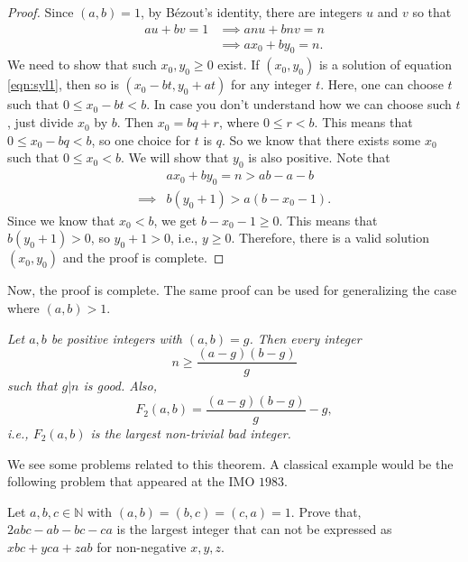 \documentclass{subfile}
\begin{document}
	\begin{proof}
		Since $(a,b)=1$, by B\'{e}zout's identity, there are integers $u$ and $v$ so that
			\begin{align}
				au+bv = 1 & \implies anu+bnv = n\nonumber\\
				& \implies ax_0+by_0  = n.\label{eqn:syl1}
			\end{align}
		We need to show that such $x_0,y_0 \geq 0$ exist. If $(x_0,y_0)$ is a solution of equation \eqref{eqn:syl1}, then so is $(x_0-bt,y_0+at)$ for any integer $t$. Here, one can choose $t$ such that $0 \leq x_0-bt<b$. In case you don't understand how we can choose such $t$, just divide $x_0$ by $b$. Then $x_0=bq+r$, where $0\leq r <b$. This means that $0 \leq x_0 -bq <b$, so one choice for $t$ is $q$. So we know that there exists some $x_0$ such that $0 \leq x_0<b$. We will show that $y_0$ is also positive. Note that
			\begin{align*}
				& ax_0+by_0 = n > ab-a-b\\
				\implies & b(y_0+1)  > a(b-x_0-1).
			\end{align*}
		Since we know that $x_0<b$, we get $b-x_0-1\geq 0$. This means that $b(y_0+1) >0$, so $y_0+1>0$, i.e., $y\geq0$. Therefore, there is a valid solution $(x_0,y_0)$ and the proof is complete.
	\end{proof}
Now, the proof is complete. The same proof can be used for generalizing the case where $(a,b)>1$.
	\begin{theorem}\slshape
		Let $a,b$ be positive integers with $(a,b)=g$. Then every integer \[n\geq\dfrac{(a-g)(b-g)}{g}\] such that $g|n$ is good. Also, \[F_2(a,b)=\dfrac{(a-g)(b-g)}{g}-g,\] i.e., $F_2(a,b)$ is the largest non-trivial bad integer.
	\end{theorem}

We see some problems related to this theorem. A classical example would be the following problem that appeared at the IMO $1983$.
	\begin{problem}[IMO 1983]
		Let $a,b,c\in\mathbb{N}$ with $(a,b)=(b,c)=(c,a)=1$. Prove that, $2abc-ab-bc-ca$ is the largest integer that can not be expressed as $xbc+yca+zab$ for non-negative $x,y,z$.
	\end{problem}
\end{document}
